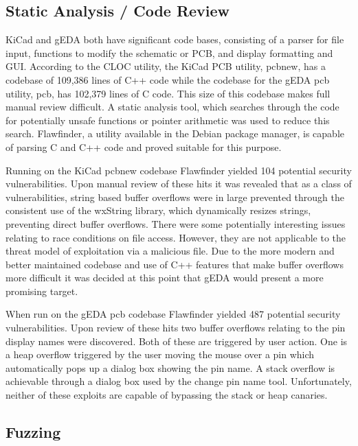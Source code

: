 \documentclass[12pt]{article}
\begin{document}
\subsection{Static Analysis / Code Review}
KiCad and gEDA both have significant code bases, consisting of a parser for file input, functions to modify the schematic or PCB, and display formatting and GUI. According to the CLOC utility, the KiCad PCB utility, pcbnew, has a codebase of 109,386 lines of C++ code while the codebase for the gEDA pcb utility, pcb, has 102,379 lines of C code. This size of this codebase makes full manual review difficult. A static analysis tool, which searches through the code for potentially unsafe functions or pointer arithmetic was used to reduce this search. Flawfinder, a utility available in the Debian package manager, is capable of parsing C and C++ code and proved suitable for this purpose. 

Running on the KiCad pcbnew codebase Flawfinder yielded 104 potential security vulnerabilities. Upon manual review of these hits it was revealed that as a class of vulnerabilities, string based buffer overflows were in large prevented through the consistent use of the wxString library, which dynamically resizes strings, preventing direct buffer overflows. There were some potentially interesting issues relating to race conditions on file access. However, they are not applicable to the threat model of exploitation via a malicious file. Due to the more modern and better maintained codebase and use of C++ features that make buffer overflows more difficult it was decided at this point that gEDA would present a more promising target. 

When run on the gEDA pcb codebase Flawfinder yielded 487 potential security vulnerabilities. Upon review of these hits two buffer overflows relating to the pin display names were discovered. Both of these are triggered by user action. One is a heap overflow triggered by the user moving the mouse over a pin which automatically pops up a dialog box showing the pin name. A stack overflow is achievable through a dialog box used by the change pin name tool. Unfortunately, neither of these exploits are capable of bypassing the stack or heap canaries. 

\subsection{Fuzzing}
\end{document}
